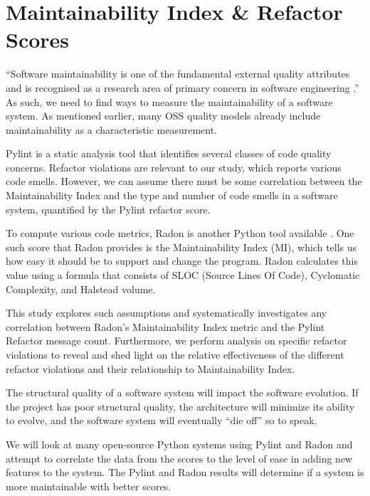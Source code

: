 \section{Maintainability Index \& Refactor Scores}

``Software maintainability is one of the fundamental external quality attributes and is recognised as a research area of primary concern in software engineering \cite{alsolai:2019}.'' As such, we need to find ways to measure the maintainability of a software system. As mentioned earlier, many OSS quality models already include maintainability as a characteristic measurement.

Pylint is a static analysis tool that identifies several classes of code quality concerns. Refactor violations are relevant to our study, which reports various code smells. However, we can assume there must be some correlation between the Maintainability Index and the type and number of code smells in a software system, quantified by the Pylint refactor score.

To compute various code metrics, Radon is another Python tool available \cite{radon:docs}. One such score that Radon provides is the Maintainability Index (MI), which tells us how easy it should be to support and change the program. Radon calculates this value using a formula that consists of SLOC (Source Lines Of Code), Cyclomatic Complexity, and Halstead volume.

This study explores such assumptions and systematically investigates any correlation between Radon's Maintainability Index metric and the Pylint Refactor message count. Furthermore, we perform analysis on specific refactor violations to reveal and shed light on the relative effectiveness of the different refactor violations and their relationship to Maintainability Index.

The structural quality of a software system will impact the software evolution. If the project has poor structural quality, the architecture will minimize its ability to evolve, and the software system will eventually ``die off'' so to speak.

We will look at many open-source Python systems using Pylint and Radon and attempt to correlate the data from the scores to the level of ease in adding new features to the system. The Pylint and Radon results will determine if a system is more maintainable with better scores.
